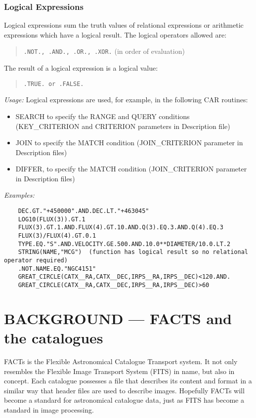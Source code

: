 \subsubsection {Logical Expressions}
Logical expressions sum the truth values of relational expressions or
arithmetic expressions which have a logical result.
The logical operators allowed are:
\begin{quote}
{\tt .NOT., .AND., .OR., .XOR.} (in order of evaluation)
\end{quote}
The result of a logical expression is a logical value:
\begin{quote}
{\tt .TRUE. or .FALSE.}
\end{quote}

{\em Usage:} Logical expressions are used, for example, in the following
CAR routines:
\begin{itemize}
\item SEARCH to specify the RANGE and QUERY conditions
(KEY\_CRITERION and CRITERION parameters in Description file)
\item JOIN to specify the MATCH condition (JOIN\_CRITERION
parameter in Description files)
\item DIFFER, to specify the MATCH condition (JOIN\_CRITERION
parameter in Description files)
\end{itemize}
{\em Examples:}
\begin{verbatim}
    DEC.GT."+450000".AND.DEC.LT."+463045"
    LOG10(FLUX(3)).GT.1
    FLUX(3).GT.1.AND.FLUX(4).GT.10.AND.Q(3).EQ.3.AND.Q(4).EQ.3
    FLUX(3)/FLUX(4).GT.0.1
    TYPE.EQ."S".AND.VELOCITY.GE.500.AND.10.0**DIAMETER/10.0.LT.2
    STRING(NAME,"MCG")  (function has logical result so no relational operator required)
    .NOT.NAME.EQ."NGC4151"
    GREAT_CIRCLE(CATX__RA,CATX__DEC,IRPS__RA,IRPS__DEC)<120.AND.
    GREAT_CIRCLE(CATX__RA,CATX__DEC,IRPS__RA,IRPS__DEC)>60
\end{verbatim}

\section {BACKGROUND --- FACTS and the catalogues}

FACTs is the Flexible Astronomical Catalogue Transport system.
It not only resembles the Flexible Image Transport System (FITS) in name, but
also in concept.
Each catalogue possesses a file that describes its content and format in a
similar way that header files are used to describe images.
Hopefully FACTs will become a standard for astronomical catalogue data, just as
FITS has become a standard in image processing.
